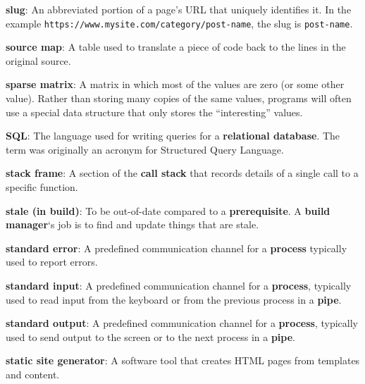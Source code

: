 \documentclass[krantzl]{krantz}
\newcommand{\glosskey}[1]{\textbf{#1}}
\begin{document}
\noindent \textbf{{\newline}\glosskey{slug}}: 
An abbreviated portion of a page’s URL that uniquely identifies it. In the example \texttt{https://www.mysite.com/category/post-name}, the slug is \texttt{post-name}.


\noindent \textbf{{\newline}\glosskey{source map}}: 
A table used to translate a piece of code back to the lines in the original source.


\noindent \textbf{{\newline}\glosskey{sparse matrix}}: 
A matrix in which most of the values are zero (or some other value). Rather than storing many copies of the same values, programs will often use a special data structure that only stores the “interesting” values.


\noindent \textbf{{\newline}\glosskey{SQL}}: 
The language used for writing queries for a \glosskey{relational database}. The term was originally an acronym for Structured Query Language.


\noindent \textbf{{\newline}\glosskey{stack frame}}: 
A section of the \glosskey{call stack} that records details of a single call to a specific function.


\noindent \textbf{{\newline}\glosskey{stale (in build)}}: 
To be out-of-date compared to a \glosskey{prerequisite}. A \glosskey{build manager}‘s job is to find and update things that are stale.


\noindent \textbf{{\newline}\glosskey{standard error}}: 
A predefined communication channel for a \glosskey{process} typically used to report errors.


\noindent \textbf{{\newline}\glosskey{standard input}}: 
A predefined communication channel for a \glosskey{process}, typically used to read input from the keyboard or from the previous process in a \glosskey{pipe}.


\noindent \textbf{{\newline}\glosskey{standard output}}: 
A predefined communication channel for a \glosskey{process}, typically used to send output to the screen or to the next process in a \glosskey{pipe}.


\noindent \textbf{{\newline}\glosskey{static site generator}}: 
A software tool that creates HTML pages from templates and content.
\end{document}

